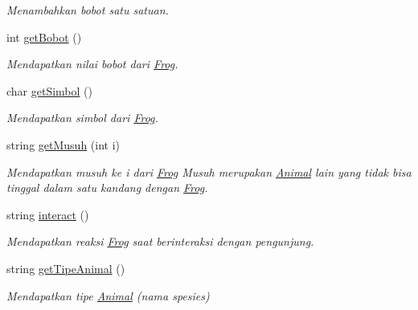 \begin{DoxyCompactItemize}
\begin{DoxyCompactList}\small\item\em Menambahkan bobot satu satuan. \end{DoxyCompactList}\item 
int \hyperlink{classFrog_af663e567deb96dc9ef3ff0a2a7f4b298}{get\-Bobot} ()
\begin{DoxyCompactList}\small\item\em Mendapatkan nilai bobot dari \hyperlink{classFrog}{Frog}. \end{DoxyCompactList}\item 
char \hyperlink{classFrog_a38e820c4f3510791ae7b8d40c9bd6b5a}{get\-Simbol} ()
\begin{DoxyCompactList}\small\item\em Mendapatkan simbol dari \hyperlink{classFrog}{Frog}. \end{DoxyCompactList}\item 
string \hyperlink{classFrog_a3968410026d8b2966b402ff5fdf87b59}{get\-Musuh} (int i)
\begin{DoxyCompactList}\small\item\em Mendapatkan musuh ke i dari \hyperlink{classFrog}{Frog} Musuh merupakan \hyperlink{classAnimal}{Animal} lain yang tidak bisa tinggal dalam satu kandang dengan \hyperlink{classFrog}{Frog}. \end{DoxyCompactList}\item 
string \hyperlink{classFrog_a7bf87b3cb6dfbee7b8de58a97796cadb}{interact} ()
\begin{DoxyCompactList}\small\item\em Mendapatkan reaksi \hyperlink{classFrog}{Frog} saat berinteraksi dengan pengunjung. \end{DoxyCompactList}\item 
string \hyperlink{classFrog_a9989ed2655d4f2bfeac06a82ef683f49}{get\-Tipe\-Animal} ()
\begin{DoxyCompactList}\small\item\em Mendapatkan tipe \hyperlink{classAnimal}{Animal} (nama spesies) \end{DoxyCompactList}\end{DoxyCompactItemize}
